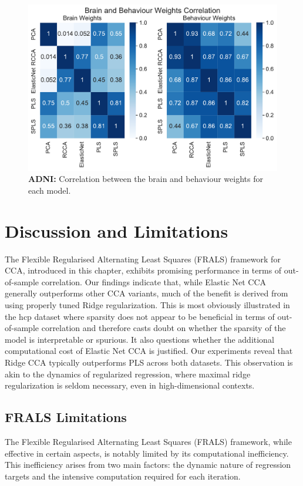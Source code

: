 \begin{figure}
    \centering
    \includegraphics[width=0.8\linewidth]{figures/adni/brain and behaviour weights correlation}
    \caption{\textbf{ADNI:} Correlation between the brain and behaviour \gls{weights} for each model.}\label{fig:brain-behaviour-weights-sim-adni}
\end{figure}

\section{Discussion and Limitations}


The Flexible Regularised Alternating Least Squares (FRALS) framework for CCA, introduced in this chapter, exhibits promising performance in terms of out-of-sample correlation.
Our findings indicate that, while Elastic Net CCA generally outperforms other CCA variants, much of the benefit is derived from using properly tuned Ridge regularization.
This is most obviously illustrated in the \acrshort{hcp} dataset where sparsity does not appear to be beneficial in terms of out-of-sample correlation and therefore casts doubt on whether the sparsity of the model is interpretable or spurious.
It also questions whether the additional computational cost of Elastic Net CCA is justified.
Our experiments reveal that Ridge CCA typically outperforms PLS across both datasets.
This observation is akin to the dynamics of regularized regression, where maximal ridge regularization is seldom necessary, even in high-dimensional contexts.

\subsection{FRALS Limitations}

The Flexible Regularised Alternating Least Squares (FRALS) framework, while effective in certain aspects, is notably limited by its computational inefficiency. This inefficiency arises from two main factors: the dynamic nature of regression targets and the intensive computation required for each iteration.

